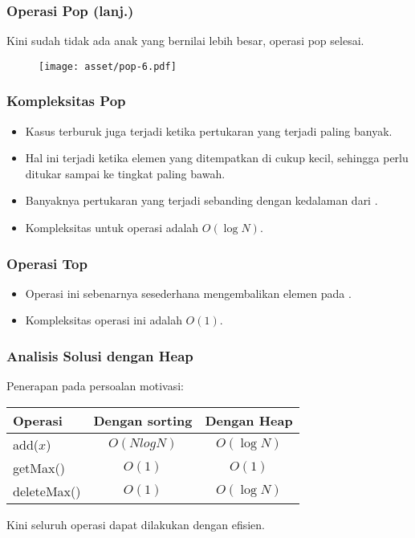 \begin{frame}
\frametitle{Operasi Pop (lanj.)}
Kini sudah tidak ada anak yang bernilai lebih besar, operasi pop selesai.
\begin{figure}
  \texttt{[image: asset/pop-6.pdf]}
\end{figure}
\end{frame}

\begin{frame}
\frametitle{Kompleksitas Pop}
\begin{itemize}
  \item Kasus terburuk juga terjadi ketika pertukaran yang terjadi paling banyak.
  \item Hal ini terjadi ketika elemen yang ditempatkan di  cukup kecil, sehingga perlu ditukar sampai ke tingkat paling bawah.
  \item Banyaknya pertukaran yang terjadi sebanding dengan kedalaman dari .
  \item Kompleksitas untuk operasi  adalah $O(\log{N})$.
\end{itemize}
\end{frame}

\begin{frame}
\frametitle{Operasi Top}
\begin{itemize}
  \item Operasi ini sebenarnya sesederhana mengembalikan elemen pada  \pbinaryHeap.
  \item Kompleksitas operasi ini adalah $O(1)$.
\end{itemize}
\end{frame}

\begin{frame}
\frametitle{Analisis Solusi dengan Heap}
Penerapan \pheap pada persoalan motivasi:
\begin{table}[ht]
  \begin{tabular}{|l|c|c|}
    \hline Operasi  & Dengan sorting & Dengan Heap \\
    \hline  add($x$) & $O(N log N)$ & $O(\log{N})$\\
    \hline  getMax() & $O(1)$ & $O(1)$\\
    \hline  deleteMax() & $O(1)$ & $O(\log{N})$\\
    \hline
  \end{tabular}
\end{table}  

Kini seluruh operasi dapat dilakukan dengan efisien.
\end{frame}

